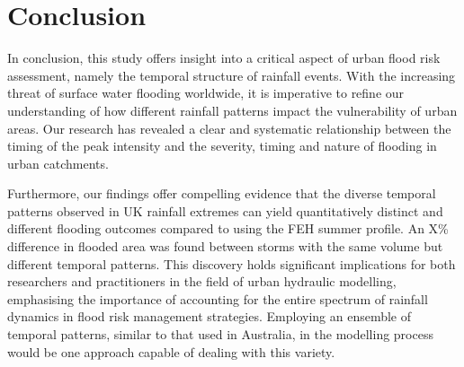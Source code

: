 \documentclass[APA,Times2COL]{WileyNJDv5}
\begin{document}

\section{Conclusion}\label{sec:conclusion}

In conclusion, this study offers insight into a critical aspect of urban flood risk assessment, namely the temporal structure of rainfall events. With the increasing threat of surface water flooding worldwide, it is imperative to refine our understanding of how different rainfall patterns impact the vulnerability of urban areas. Our research has revealed a clear and systematic relationship between the timing of the peak intensity and the severity, timing and nature of flooding in urban catchments. 

Furthermore, our findings offer compelling evidence that the diverse temporal patterns observed in UK rainfall extremes can yield quantitatively distinct and different flooding outcomes compared to using the FEH summer profile. An X\% difference in flooded area was found between storms with the same volume but different temporal patterns. This discovery holds significant implications for both researchers and practitioners in the field of urban hydraulic modelling, emphasising the importance of accounting for the entire spectrum of rainfall dynamics in flood risk management strategies. Employing an ensemble of temporal patterns, similar to that used in Australia, in the modelling process would be one approach capable of dealing with this variety. 
\end{document}
